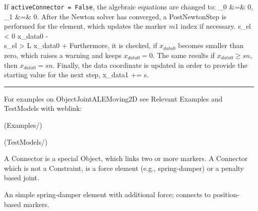     \noindent If \texttt{activeConnector = False}, the algebraic equations are changed to:
    \bea
      \lambda_0 &=& 0,   \\
      \lambda_1 &=& 0.
    \eea   
    After the Newton solver has converged, a PostNewtonStep is performed for the element, which
    updates the marker $m1$ index if necessary.
    \bea
      s_{el} < 0 \quad \ra \quad x_{data0} \;-\! \nonumber\\
      s_{el} > L \quad \ra \quad x_{data0} \;+\!
    \eea
    Furthermore, it is checked, if $x_{data0}$ becomes smaller than zero, which raises a warning and keeps $x_{data0}=0$.
    The same results if $x_{data0}\ge sn$, then $x_{data0} = sn$.
    Finally, the data coordinate is updated in order to provide the starting value for the next step,
    \be
      x_{data1} \;+\!\!= s.
    \ee
\vspace{6pt}\par\noindent\rule{\textwidth}{0.4pt}
%
\noindent For examples on ObjectJointALEMoving2D see Relevant Examples and TestModels with weblink:
\bi
\item {} (Examples/)
\item {} (TestModels/)

\ei

%

\newpage
A Connector is a special Object, which links two or more markers. A Connector which is not a Constraint, is a force element (e.g., spring-damper) or a penalty based joint.


\label{sec:item:ObjectConnectorSpringDamper}
An simple spring-damper element with additional force; connects to position-based markers.
\vspace{12pt}\\

